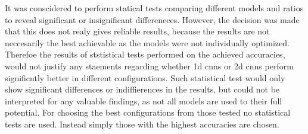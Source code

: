 \newpage



 
It was conscidered to perform statical tests comparing different models and ratios to reveal significant or insignificant differeneces. However, the decision was made that this does not realy gives reliable results, because the results are not neccesarily the best achievable as the models were not individually optimized. Therefoe the results of ststistical tests performed on the achieved accuracies, would not justify any staements regarding whether 1d cnns or 2d cnns perform significntly better in different configurations. Such statistical test would only show significant differences or indiffierences in the results, but could not be interpreted for any valuable findings, as not all models are used to their full potential. For choosing the best configurations from those tested no statistical tests are used. Instead simply those with the highest accuracies are chosen.

